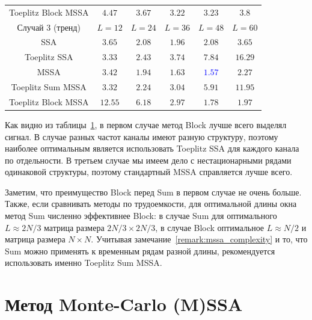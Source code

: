 \documentclass[specialist,
substylefile = spbu_report.rtx,
subf,href,colorlinks=true, 12pt]{disser}
\theoremstyle{definition}
\begin{document}
\begin{table}[h]
\begin{tabular}{cccccc}
			\hline
			Toeplitz Block MSSA              & $4.47$  & $3.67$                     & $\mathbf{3.22}$            & $\mathbf{3.23}$            & $3.8$           \\
			\hhline{======}
			Случай 3 (тренд)                 & $L=12$  & $L=24$                     & $L=36$                     & $L=48$                     & $L=60$          \\
			\hline
			SSA                              & $3.65$  & $2.08$                     & $\mathbf{1.96}$            & $2.08$                     & $3.65$          \\
			\hline
			Toeplitz SSA                     & $3.33$  & $\mathbf{2.43}$            & $3.74$                     & $7.84$                     & $16.29$         \\
			\hline
			MSSA                             & $3.42$  & $1.94$                     & $1.63$                     & \textcolor{blue}{${\mathbf{1.57}}$} & $2.27$          \\
			\hline
			Toeplitz Sum MSSA                & $3.32$  & $\mathbf{2.24}$            & $3.04$                     & $5.91$                     & $11.95$         \\
			\hline
			Toeplitz Block MSSA              & $12.55$ & $6.18$                     & $2.97$                     & $\mathbf{1.78}$            & $1.97$          \\
			\hline
		\end{tabular}
	\label{tab:mse}
\end{table}

Как видно из таблицы~\ref{tab:mse}, в первом случае метод Block лучше всего выделял сигнал. В случае разных частот каналы имеют разную структуру, поэтому наиболее оптимальным является использовать Toeplitz SSA для каждого канала по отдельности.  В третьем случае мы имеем дело с нестационарными рядами одинаковой структуры, поэтому стандартный MSSA справляется лучше всего.

Заметим, что преимущество Block перед Sum в первом случае не очень больше. Также, если сравнивать методы по трудоемкости, для оптимальной длины окна метод Sum численно эффективнее Block: в случае Sum для оптимального $L\approx 2N/3$ матрица размера $2N/3\times2N/3$, в случае Block оптимальное $L\approx N/2$ и матрица размера $N\times N$. Учитывая замечание~\ref{remark:mssa_complexity} и то, что Sum можно применять к временным рядам разной длины, рекомендуется использовать именно Toeplitz Sum MSSA.

\chapter{Метод Monte-Carlo (M)SSA}\label{chpt:mc-ssa}
\end{document}
